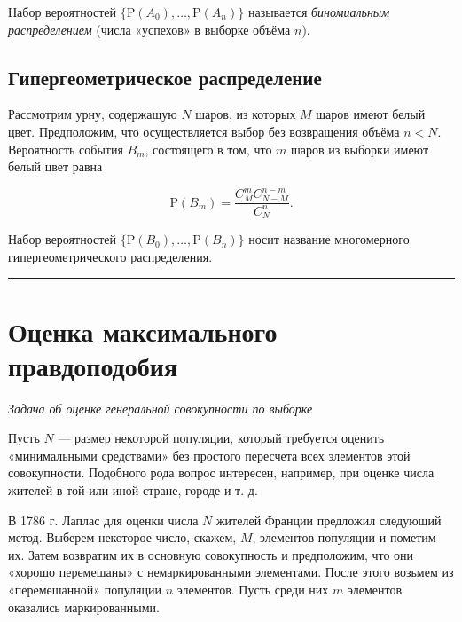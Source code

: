 \documentclass[11pt,a4paper]{article}
\renewcommand{\linethickness}{0.1ex}
\begin{document}
Набор вероятностей \(\{\mathrm{P}(A_0), \ldots,\mathrm{P}(A_n)\}\)
называется \emph{биномиальным распределением} (числа «успехов» в выборке
объёма \(n\)).

    \hypertarget{ux433ux438ux43fux435ux440ux433ux435ux43eux43cux435ux442ux440ux438ux447ux435ux441ux43aux43eux435-ux440ux430ux441ux43fux440ux435ux434ux435ux43bux435ux43dux438ux435}{%
\subsection{Гипергеометрическое
распределение}\label{ux433ux438ux43fux435ux440ux433ux435ux43eux43cux435ux442ux440ux438ux447ux435ux441ux43aux43eux435-ux440ux430ux441ux43fux440ux435ux434ux435ux43bux435ux43dux438ux435}}

Рассмотрим урну, содержащую \(N\) шаров, из которых \(M\) шаров имеют
белый цвет. Предположим, что осуществляется выбор без возвращения объёма
\(n < N\). Вероятность события \(B_m\), состоящего в том, что \(m\)
шаров из выборки имеют белый цвет равна

\[ \mathrm{P}(B_m) = \dfrac{C_M^m C_{N-M}^{n-m}}{C_N^n}. \]

Набор вероятностей \(\{\mathrm{P}(B_0), \ldots,\mathrm{P}(B_n)\}\) носит
название многомерного гипергеометрического распределения.

    \begin{center}\rule{0.5\linewidth}{\linethickness}\end{center}

    \hypertarget{ux43eux446ux435ux43dux43aux430-ux43cux430ux43aux441ux438ux43cux430ux43bux44cux43dux43eux433ux43e-ux43fux440ux430ux432ux434ux43eux43fux43eux434ux43eux431ux438ux44f}{%
\section{Оценка максимального
правдоподобия}\label{ux43eux446ux435ux43dux43aux430-ux43cux430ux43aux441ux438ux43cux430ux43bux44cux43dux43eux433ux43e-ux43fux440ux430ux432ux434ux43eux43fux43eux434ux43eux431ux438ux44f}}

\emph{Задача об оценке генеральной совокупности по выборке}

    Пусть \(N\) --- размер некоторой популяции, который требуется оценить
«минимальными средствами» без простого пересчета всех элементов этой
совокупности. Подобного рода вопрос интересен, например, при оценке
числа жителей в той или иной стране, городе и т. д.

В 1786 г. Лаплас для оценки числа \(N\) жителей Франции предложил
следующий метод. Выберем некоторое число, скажем, \(M\), элементов
популяции и пометим их. Затем возвратим их в основную совокупность и
предположим, что они «хорошо перемешаны» с немаркированными элементами.
После этого возьмем из «перемешанной» популяции \(n\) элементов. Пусть
среди них \(m\) элементов оказались маркированными.
\end{document}
